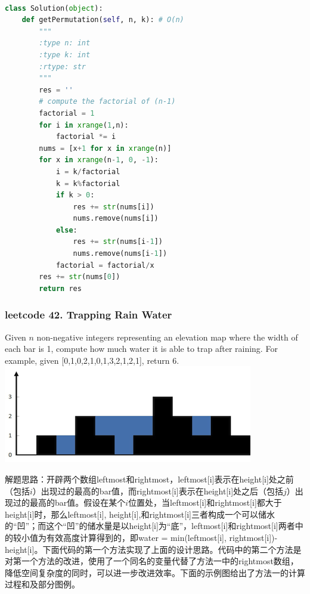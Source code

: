\documentclass[a4paper,10pt]{article}
\begin{document}
\begin{lstlisting}[language=Python, caption=Problem60. Permutation Sequence]

class Solution(object):
    def getPermutation(self, n, k): # O(n)
        """
        :type n: int
        :type k: int
        :rtype: str
        """
        res = ''
        # compute the factorial of (n-1)
        factorial = 1
        for i in xrange(1,n): 
            factorial *= i
        nums = [x+1 for x in xrange(n)]
        for x in xrange(n-1, 0, -1):
            i = k/factorial
            k = k%factorial
            if k > 0:
                res += str(nums[i])
                nums.remove(nums[i])
            else:
                res += str(nums[i-1])
                nums.remove(nums[i-1])
            factorial = factorial/x
        res += str(nums[0])
        return res
\end{lstlisting}


\subsubsection{leetcode 42. Trapping Rain Water}
Given $n$ non-negative integers representing an elevation map where the width of each bar is 1, compute how much water it is able to trap after raining. For example, 
given [0,1,0,2,1,0,1,3,2,1,2,1], return 6.\\

\includegraphics[]{rainwatertrap.png}\\

\begin{CJK*}{UTF8}{gbsn}
\noindent 解题思路：开辟两个数组leftmost和rightmost，leftmost[i]表示在height[i]处之前（包括$i$）出现过的最高的bar值，而rightmost[i]表示在height[i]处之后（包括$j$）出现过的最高的bar值。假设在某个$i$位置处，当leftmost[i]和rightmost[i]都大于height[i]时，那么leftmost[i], height[i],和rightmost[i]三者构成一个可以储水的“凹”；而这个“凹”的储水量是以height[i]为“底”，leftmost[i]和rightmost[i]两者中的较小值为有效高度计算得到的，即water = min(leftmost[i], rightmost[i])-height[i]。下面代码的第一个方法实现了上面的设计思路。代码中的第二个方法是对第一个方法的改进，使用了一个同名的变量代替了方法一中的rightmost数组，降低空间复杂度的同时，可以进一步改进效率。下面的示例图给出了方法一的计算过程和及部分图例。
\end{CJK*}
\end{document}
